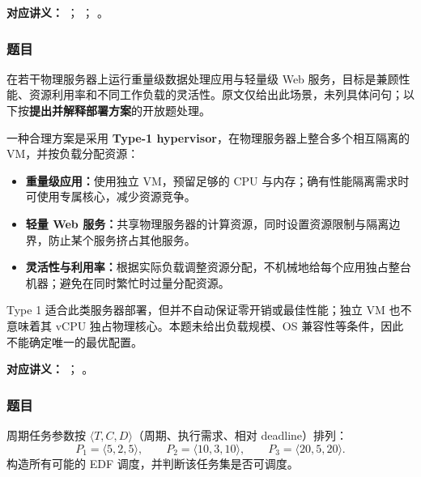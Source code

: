 \nopagebreak[4]

\textbf{对应讲义：}
；
；
。

\subsubsection*{题目}

在若干物理服务器上运行重量级数据处理应用与轻量级 Web 服务，目标是兼顾性能、资源利用率和不同工作负载的灵活性。原文仅给出此场景，未列具体问句；以下按\textbf{提出并解释部署方案}的开放题处理。

\begin{checkedsolution}
\nopagebreak[4]
一种合理方案是采用 \textbf{Type-1 hypervisor}，在物理服务器上整合多个相互隔离的 VM，并按负载分配资源：
\begin{itemize}
  \item \textbf{重量级应用：}使用独立 VM，预留足够的 CPU 与内存；确有性能隔离需求时可使用专属核心，减少资源竞争。
  \item \textbf{轻量 Web 服务：}共享物理服务器的计算资源，同时设置资源限制与隔离边界，防止某个服务挤占其他服务。
  \item \textbf{灵活性与利用率：}根据实际负载调整资源分配，不机械地给每个应用独占整台机器；避免在同时繁忙时过量分配资源。
\end{itemize}
Type 1 适合此类服务器部署，但并不自动保证零开销或最佳性能；独立 VM 也不意味着其 vCPU 独占物理核心。本题未给出负载规模、OS 兼容性等条件，因此不能确定唯一的最优配置。
\end{checkedsolution}

\nopagebreak[4]

\textbf{对应讲义：}
；
。

\subsubsection*{题目}

周期任务参数按 $\langle T,C,D\rangle$（周期、执行需求、相对 deadline）排列：
\[
  P_1=\langle5,2,5\rangle,\qquad
  P_2=\langle10,3,10\rangle,\qquad
  P_3=\langle20,5,20\rangle.
\]
构造所有可能的 EDF 调度，并判断该任务集是否可调度。

